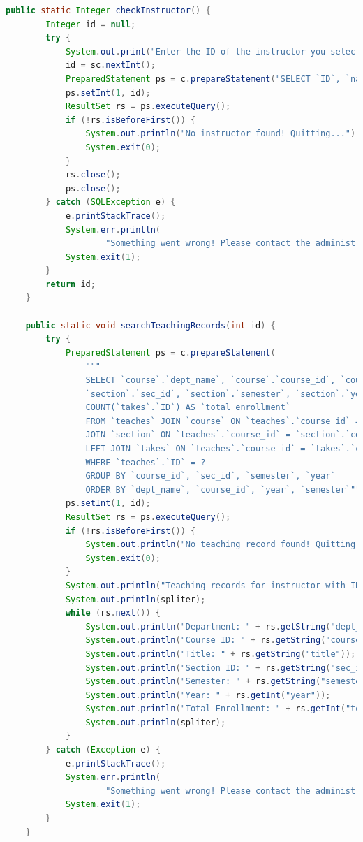 \documentclass{article}
\begin{document}
\begin{lstlisting}[language=java]
    public static Integer checkInstructor() {
        Integer id = null;
        try {
            System.out.print("Enter the ID of the instructor you select: ");
            id = sc.nextInt();
            PreparedStatement ps = c.prepareStatement("SELECT `ID`, `name` FROM `instructor` WHERE `ID` = ?");
            ps.setInt(1, id);
            ResultSet rs = ps.executeQuery();
            if (!rs.isBeforeFirst()) {
                System.out.println("No instructor found! Quitting...");
                System.exit(0);
            }
            rs.close();
            ps.close();
        } catch (SQLException e) {
            e.printStackTrace();
            System.err.println(
                    "Something went wrong! Please contact the administrator for help or try again later!(check the error message above)");
            System.exit(1);
        }
        return id;
    }

    public static void searchTeachingRecords(int id) {
        try {
            PreparedStatement ps = c.prepareStatement(
                """
                SELECT `course`.`dept_name`, `course`.`course_id`, `course`.`title`,
                `section`.`sec_id`, `section`.`semester`, `section`.`year`,
                COUNT(`takes`.`ID`) AS `total_enrollment`
                FROM `teaches` JOIN `course` ON `teaches`.`course_id` = `course`.`course_id`
                JOIN `section` ON `teaches`.`course_id` = `section`.`course_id` AND `teaches`.`sec_id` = `section`.`sec_id`
                LEFT JOIN `takes` ON `teaches`.`course_id` = `takes`.`course_id` AND `teaches`.`sec_id` = `takes`.`sec_id`
                WHERE `teaches`.`ID` = ?
                GROUP BY `course_id`, `sec_id`, `semester`, `year`
                ORDER BY `dept_name`, `course_id`, `year`, `semester`""");
            ps.setInt(1, id);
            ResultSet rs = ps.executeQuery();
            if (!rs.isBeforeFirst()) {
                System.out.println("No teaching record found! Quitting...");
                System.exit(0);
            }
            System.out.println("Teaching records for instructor with ID " + id + ":");
            System.out.println(spliter);
            while (rs.next()) {
                System.out.println("Department: " + rs.getString("dept_name"));
                System.out.println("Course ID: " + rs.getString("course_id"));
                System.out.println("Title: " + rs.getString("title"));
                System.out.println("Section ID: " + rs.getString("sec_id"));
                System.out.println("Semester: " + rs.getString("semester"));
                System.out.println("Year: " + rs.getInt("year"));
                System.out.println("Total Enrollment: " + rs.getInt("total_enrollment"));
                System.out.println(spliter);
            }
        } catch (Exception e) {
            e.printStackTrace();
            System.err.println(
                    "Something went wrong! Please contact the administrator for help or try again later!(check the error message above)");
            System.exit(1);
        }
    }


\end{lstlisting}
\end{document}
